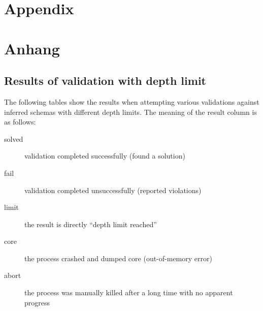 
{\chapter{Appendix}}    %
{\chapter{Anhang}}      %
\label{chap:appendix}

\section{Results of validation with depth limit}
\label{sec:appendix:depth-limit}

The following tables show the results
when attempting various validations against inferred schemas
with different depth limits.
The meaning of the result column is as follows:

\begin{description}
\item[solved] validation completed successfully (found a solution)
\item[fail] validation completed unsuccessfully (reported violations)
\item[limit] the result is directly “depth limit reached” %
\item[core] the process crashed and dumped core (out-of-memory error)
\item[abort] the process was manually killed after a long time with no apparent progress
\end{description}

